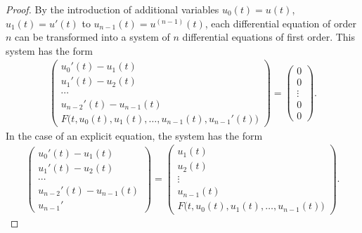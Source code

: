 \begin{proof}
  By the introduction of additional variables $u_0(t) = u(t)$, $u_1(t)
  = u'(t)$ to $u_{n-1}(t) = u^{(n-1)}(t)$, each differential equation of
  order $n$ can be transformed into a system of $n$ differential equations
  of first order. This system has the form
  \begin{gather}
    \label{eq:awa:13}
    \begin{pmatrix}
      u_0'(t) - u_1(t) \\
      u_1'(t) - u_2(t) \\
      \cdots\\
      u_{n-2}'(t) - u_{n-1}(t) \\
      F\bigl(t, u_0(t),u_1(t),\dots,u_{n-1}(t), u_{n-1}'(t)\bigr)
    \end{pmatrix}
    =
    \begin{pmatrix}
      0\\0\\\vdots\\0\\0
    \end{pmatrix}.
  \end{gather}
  In the case of an explicit equation, the system has the form
  \begin{gather}
    \label{eq:awa:13a}
    \begin{pmatrix}
      u_0'(t) - u_1(t) \\
      u_1'(t) - u_2(t) \\
      \cdots\\
      u_{n-2}'(t) - u_{n-1}(t) \\
      u_{n-1}'
    \end{pmatrix}
    =
    \begin{pmatrix}
      u_1(t)\\u_2(t)\\\vdots\\u_{n-1}(t)\\F\bigl(t, u_0(t),u_1(t),\dots,u_{n-1}(t)\bigr)
    \end{pmatrix}.
  \end{gather}
\end{proof}


